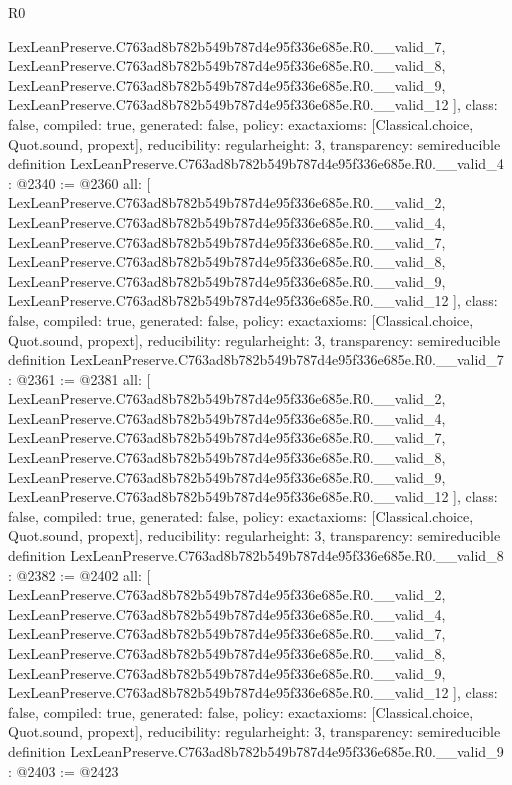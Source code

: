 \begin{lexlean}{R0}
\begin{coremodule}
{    LexLeanPreserve.C763ad8b782b549b787d4e95f336e685e.R0.__valid_7,
    LexLeanPreserve.C763ad8b782b549b787d4e95f336e685e.R0.__valid_8,
    LexLeanPreserve.C763ad8b782b549b787d4e95f336e685e.R0.__valid_9,
    LexLeanPreserve.C763ad8b782b549b787d4e95f336e685e.R0.__valid_12
  ],
  class: false,
  compiled: true,
  generated: false,
  policy: exact{axioms: [Classical.choice, Quot.sound, propext]},
  reducibility: regular{height: 3},
  transparency: semireducible
}
definition LexLeanPreserve.C763ad8b782b549b787d4e95f336e685e.R0.__valid_4 : @2340 := @2360 {
  all: [
    LexLeanPreserve.C763ad8b782b549b787d4e95f336e685e.R0.__valid_2,
    LexLeanPreserve.C763ad8b782b549b787d4e95f336e685e.R0.__valid_4,
    LexLeanPreserve.C763ad8b782b549b787d4e95f336e685e.R0.__valid_7,
    LexLeanPreserve.C763ad8b782b549b787d4e95f336e685e.R0.__valid_8,
    LexLeanPreserve.C763ad8b782b549b787d4e95f336e685e.R0.__valid_9,
    LexLeanPreserve.C763ad8b782b549b787d4e95f336e685e.R0.__valid_12
  ],
  class: false,
  compiled: true,
  generated: false,
  policy: exact{axioms: [Classical.choice, Quot.sound, propext]},
  reducibility: regular{height: 3},
  transparency: semireducible
}
definition LexLeanPreserve.C763ad8b782b549b787d4e95f336e685e.R0.__valid_7 : @2361 := @2381 {
  all: [
    LexLeanPreserve.C763ad8b782b549b787d4e95f336e685e.R0.__valid_2,
    LexLeanPreserve.C763ad8b782b549b787d4e95f336e685e.R0.__valid_4,
    LexLeanPreserve.C763ad8b782b549b787d4e95f336e685e.R0.__valid_7,
    LexLeanPreserve.C763ad8b782b549b787d4e95f336e685e.R0.__valid_8,
    LexLeanPreserve.C763ad8b782b549b787d4e95f336e685e.R0.__valid_9,
    LexLeanPreserve.C763ad8b782b549b787d4e95f336e685e.R0.__valid_12
  ],
  class: false,
  compiled: true,
  generated: false,
  policy: exact{axioms: [Classical.choice, Quot.sound, propext]},
  reducibility: regular{height: 3},
  transparency: semireducible
}
definition LexLeanPreserve.C763ad8b782b549b787d4e95f336e685e.R0.__valid_8 : @2382 := @2402 {
  all: [
    LexLeanPreserve.C763ad8b782b549b787d4e95f336e685e.R0.__valid_2,
    LexLeanPreserve.C763ad8b782b549b787d4e95f336e685e.R0.__valid_4,
    LexLeanPreserve.C763ad8b782b549b787d4e95f336e685e.R0.__valid_7,
    LexLeanPreserve.C763ad8b782b549b787d4e95f336e685e.R0.__valid_8,
    LexLeanPreserve.C763ad8b782b549b787d4e95f336e685e.R0.__valid_9,
    LexLeanPreserve.C763ad8b782b549b787d4e95f336e685e.R0.__valid_12
  ],
  class: false,
  compiled: true,
  generated: false,
  policy: exact{axioms: [Classical.choice, Quot.sound, propext]},
  reducibility: regular{height: 3},
  transparency: semireducible
}
definition LexLeanPreserve.C763ad8b782b549b787d4e95f336e685e.R0.__valid_9 : @2403 := @2423 {
}
\end{coremodule}
\end{lexlean}
